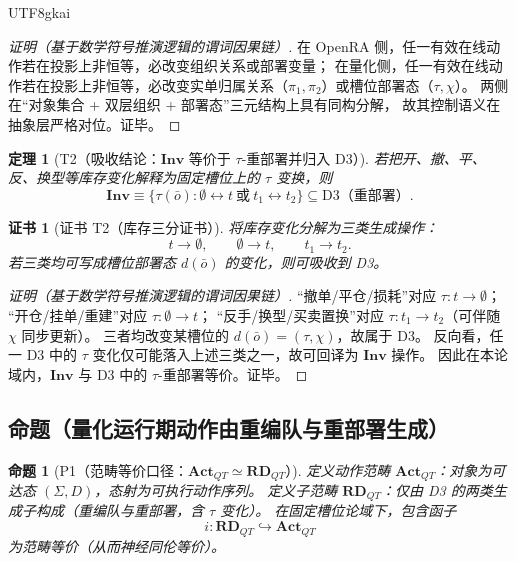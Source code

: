 \documentclass[12pt]{article}
\newtheorem{theorem}{定理}[section]
\newtheorem{proposition}{命题}[section]
\newtheorem{Certificate}{证书}[section]
\begin{document}
\begin{CJK*}{UTF8}{gkai}
\begin{proof}[证明（基于数学符号推演逻辑的谓词因果链）]
在 OpenRA 侧，任一有效在线动作若在投影上非恒等，必改变组织关系或部署变量；
在量化侧，任一有效在线动作若在投影上非恒等，必改变实单归属关系（$\pi_1,\pi_2$）或槽位部署态（$\tau,\chi$）。
两侧在“对象集合 + 双层组织 + 部署态”三元结构上具有同构分解，
故其控制语义在抽象层严格对位。证毕。
\end{proof}

\begin{theorem}[T2（吸收结论：$\mathbf{Inv}$ 等价于 $\tau$-重部署并归入 D3）]
\label{thm:tex28-ch18-t2}
若把开、撤、平、反、换型等库存变化解释为固定槽位上的 $\tau$ 变换，则
\[
  \mathbf{Inv}
  \equiv
  \{\tau(\bar o):\emptyset\leftrightarrow t\ \text{或}\ t_1\leftrightarrow t_2\}
  \subseteq
  \text{D3（重部署）}.
\]
\end{theorem}

\begin{Certificate}[证书 T2（库存三分证书）]
\label{cert:tex28-ch18-t2}
将库存变化分解为三类生成操作：
\[
  t\to\emptyset,\qquad
  \emptyset\to t,\qquad
  t_1\to t_2.
\]
若三类均可写成槽位部署态 $d(\bar o)$ 的变化，则可吸收到 D3。
\end{Certificate}

\begin{proof}[证明（基于数学符号推演逻辑的谓词因果链）]
“撤单/平仓/损耗”对应 $\tau:t\to\emptyset$；
“开仓/挂单/重建”对应 $\tau:\emptyset\to t$；
“反手/换型/买卖置换”对应 $\tau:t_1\to t_2$（可伴随 $\chi$ 同步更新）。
三者均改变某槽位的 $d(\bar o)=(\tau,\chi)$，故属于 D3。
反向看，任一 D3 中的 $\tau$ 变化仅可能落入上述三类之一，故可回译为 $\mathbf{Inv}$ 操作。
因此在本论域内，$\mathbf{Inv}$ 与 D3 中的 $\tau$-重部署等价。证毕。
\end{proof}

\subsection{命题（量化运行期动作由重编队与重部署生成）}
\label{subsec:tex28-ch18-prop}

\begin{proposition}[P1（范畴等价口径：$\mathbf{Act}_{QT}\simeq\mathbf{RD}_{QT}$）]
\label{prop:tex28-ch18-p1}
定义动作范畴 $\mathbf{Act}_{QT}$：对象为可达态 $(\Sigma,D)$，态射为可执行动作序列。
定义子范畴 $\mathbf{RD}_{QT}$：仅由 D3 的两类生成子构成（重编队与重部署，含 $\tau$ 变化）。
在固定槽位论域下，包含函子
\[
  i:\mathbf{RD}_{QT}\hookrightarrow\mathbf{Act}_{QT}
\]
为范畴等价（从而神经同伦等价）。
\end{proposition}


\end{CJK*}
\end{document}
